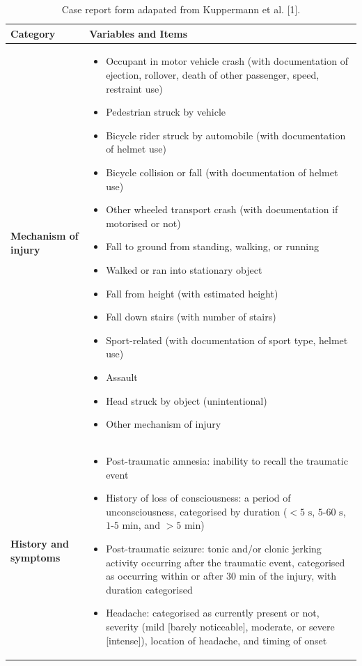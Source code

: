 \documentclass[10pt,letterpaper]{article}
\begin{document}
\begin{table}[htbp]
\footnotesize
\centering
\caption{Case report form adapated from Kuppermann et al. [1].}
\label{tab:form}
\begin{tabularx}{\textwidth}{>{\bfseries\hsize=0.3\hsize}X X}
\toprule
Category & Variables and Items \\
\midrule
Mechanism of injury & 
\begin{itemize}[leftmargin=*, nosep]
    \item Occupant in motor vehicle crash (with documentation of ejection, rollover, death of other passenger, speed, restraint use)
    \item Pedestrian struck by vehicle
    \item Bicycle rider struck by automobile (with documentation of helmet use)
    \item Bicycle collision or fall (with documentation of helmet use)
    \item Other wheeled transport crash (with documentation if motorised or not)
    \item Fall to ground from standing, walking, or running
    \item Walked or ran into stationary object
    \item Fall from height (with estimated height)
    \item Fall down stairs (with number of stairs)
    \item Sport-related (with documentation of sport type, helmet use)
    \item Assault
    \item Head struck by object (unintentional)
    \item Other mechanism of injury
\end{itemize} \\
\addlinespace
History and symptoms & 
\begin{itemize}[leftmargin=*, nosep]
    \item Post-traumatic amnesia: inability to recall the traumatic event
    \item History of loss of consciousness: a period of unconsciousness, categorised by duration ($<5\text{ s}$, $5\text{-}60\text{ s}$, $1\text{-}5\text{ min}$, and $>5\text{ min}$)
    \item Post-traumatic seizure: tonic and/or clonic jerking activity occurring after the traumatic event, categorised as occurring within or after $30\text{ min}$ of the injury, with duration categorised
    \item Headache: categorised as currently present or not, severity (mild [barely noticeable], moderate, or severe [intense]), location of headache, and timing of onset

\end{itemize}
\end{tabularx}
\end{table}
\end{document}
